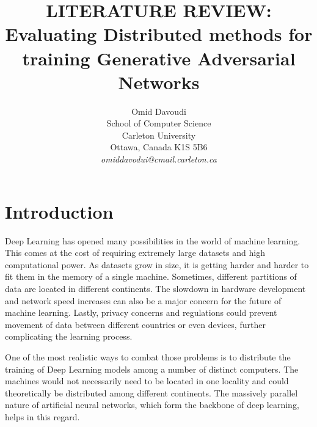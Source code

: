 \documentclass[11pt]{article}       %
\begin{document}


\title{LITERATURE REVIEW: Evaluating Distributed methods for training Generative Adversarial Networks}


\author{
Omid Davoudi\\
School of Computer Science\\
Carleton University\\
Ottawa, Canada K1S 5B6\\
{\em omiddavodui@cmail.carleton.ca}
} %

\maketitle



\section{Introduction} \label{intro}

Deep Learning has opened many possibilities in the world of machine learning. This comes at the cost of requiring extremely large datasets and high computational power. As datasets grow in size, it is getting harder and harder to fit them in the memory of a single machine. Sometimes, different partitions of data are located in different continents. The slowdown in hardware development and network speed increases can also be a major concern for the future of machine learning. Lastly, privacy concerns and regulations could prevent movement of data between different countries or even devices, further complicating the learning process.

One of the most realistic ways to combat those problems is to distribute the training of Deep Learning models among a number of distinct computers. The machines would not necessarily need to be located in one locality and could theoretically be distributed among different continents. The massively parallel nature of artificial neural networks, which form the backbone of deep learning, helps in this regard.
\end{document}
